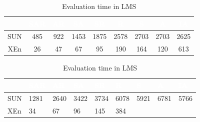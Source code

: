 \begin{table}[t]
\centering
\begin{tabular}{|>{\tiny}c|>{\tiny}c|>{\tiny}c|>{\tiny}c|>{\tiny}c|>{\tiny}c|>{\tiny}c|>{\tiny}c|>{\tiny}c|}   
\hline  \rowcolor{black} \scriptsize \bf \textcolor {white}{}
& \scriptsize \bf \textcolor {white}{SAR}
& \scriptsize \bf \textcolor {white}{AR}
& \scriptsize \bf \textcolor  {white}{SA}
& \scriptsize \bf \textcolor  {white}{SR}
& \scriptsize \bf \textcolor  {white}{R}

& \scriptsize \bf \textcolor  {white}{S} 
& \scriptsize \bf \textcolor  {white}{A}
& \scriptsize \bf \textcolor {white}{IA}\\ \hline
\scriptsize  {SUN }
&\scriptsize  {485}
& \scriptsize {922}
& \scriptsize {1453}
& \scriptsize {1875}
& \scriptsize {2578}

& \scriptsize {2703}
& \scriptsize {2703}
& \scriptsize {2625}
  \\ \hline
\scriptsize  {XEn}
&\scriptsize  {26}
& \scriptsize {47}
& \scriptsize {67}
& \scriptsize {95}
& \scriptsize {190}

& \scriptsize {164}
& \scriptsize {120}
& \scriptsize {613}
  \\ \hline
\end{tabular}

\caption{Evaluation time in LMS}
\label{table:LMSeval}
\vspace{5 mm}
\centering
\begin{tabular}{|l|l|l|l|l|l|l|l|l|}   
\hline  \rowcolor{black} \scriptsize \bf \textcolor {white}{}
& \scriptsize \bf \textcolor {white}{SAR}
& \scriptsize \bf \textcolor {white}{AR}
& \scriptsize \bf \textcolor  {white}{SA}
& \scriptsize \bf \textcolor  {white}{SR}
& \scriptsize \bf \textcolor  {white}{R}

& \scriptsize \bf \textcolor  {white}{S} 
& \scriptsize \bf \textcolor  {white}{A}

& \scriptsize \bf \textcolor {white}{IA}\\ \hline

\scriptsize  {SUN }
& \scriptsize  {1281}
& \scriptsize {2640}
& \scriptsize {3422}
& \scriptsize {3734}
& \scriptsize {6078}

& \scriptsize {5921}
& \scriptsize {6781}
& \scriptsize {5766}
  \\ \hline
\scriptsize  {XEn}
& \scriptsize  {34}
& \scriptsize {67}
& \scriptsize {96}
& \scriptsize {145}
& \scriptsize {384}


\end{tabular}
\end{table}
